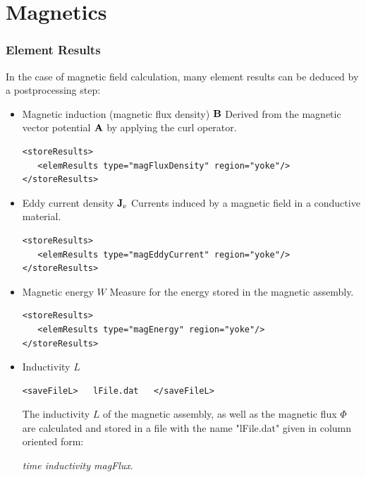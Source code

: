 \newpage
\section{Magnetics}
\subsubsection{Element Results}
In the case of magnetic field calculation, many element results can be
deduced by a postprocessing step:

\begin{itemize}
\item Magnetic induction (magnetic flux density) ${\bf B}$
    \newline Derived from the magnetic vector potential ${\bf A}$ by
    applying the curl operator.
  
\begin{verbatim}
<storeResults>
   <elemResults type="magFluxDensity" region="yoke"/>
</storeResults>
\end{verbatim}
  
\item Eddy current density ${\bf J}_{\rm e}$ 
    \newline Currents induced by a magnetic field in a conductive
    material. 

\begin{verbatim}
<storeResults>
   <elemResults type="magEddyCurrent" region="yoke"/>
</storeResults>
\end{verbatim}
  
  
\item Magnetic energy $W$ 
    \newline Measure for the energy stored in the magnetic assembly.
  
\begin{verbatim}
<storeResults>
   <elemResults type="magEnergy" region="yoke"/>
</storeResults>
\end{verbatim}

\item  Inductivity $L$ 

\begin{verbatim}
<saveFileL>   lFile.dat   </saveFileL>
\end{verbatim}

The inductivity $L$ of the magnetic assembly, as well as
the magnetic flux $\Phi$ are calculated and stored in a file with
the name "lFile.dat"  given in column oriented form:

{\em time inductivity magFlux}.  
  


\end{itemize}

